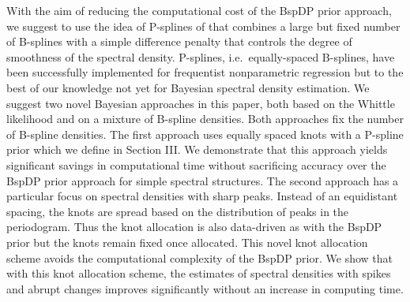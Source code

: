 \documentclass[twocolumn,final]{svjour3}
\begin{document}

With the aim of reducing the computational cost of the BspDP prior approach,  we suggest to use the idea of P-splines of \cite{Eilers:1996} that combines a large but fixed number of  B-splines with a simple difference penalty that controls the degree of  smoothness of the spectral density. P-splines, i.e.\  equally-spaced B-splines,  have been successfully implemented for frequentist nonparametric regression but to the best of our knowledge not yet for Bayesian spectral density estimation. We suggest two novel Bayesian  approaches in this paper, both based on the Whittle likelihood and on a mixture of B-spline densities. Both approaches fix the  number of B-spline densities.  The first approach uses equally spaced knots with a P-spline prior which we define in Section III. We demonstrate that this approach yields significant savings in computational time without sacrificing accuracy over the BspDP prior approach for simple spectral structures.  The second approach has a particular  focus on spectral densities with sharp peaks. Instead of an equidistant spacing, the knots are spread based on the distribution of peaks in the periodogram. Thus the knot allocation is also data-driven as with the BspDP prior but the knots  remain fixed once allocated. This novel knot allocation scheme avoids the computational complexity of the BspDP prior.  We show that with this knot allocation scheme, the estimates of spectral densities with spikes and abrupt changes improves significantly without an increase in computing time.

\end{document}
